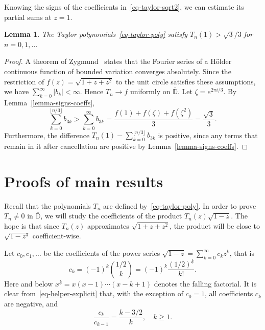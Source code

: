 \documentclass[12pt]{amsart}
\newtheorem{lemma}[theorem]{Lemma}
\theoremstyle{definition}
\theoremstyle{remark}
\numberwithin{equation}{section}
\begin{document}
Knowing the signs of the coefficients in~\eqref{eq-taylor-sqrt2}, we can estimate its partial sums at $z=1$. 

\begin{lemma}\label{lemma-taylor-at1} The Taylor polynomials~\eqref{eq-taylor-poly} satisfy $T_n(1)>\sqrt{3}/3$ for $n=0,1,\dots$
\end{lemma}

\begin{proof} A theorem of Zygmund~\cite[Theorem VI.3.6]{Zygmund} states that the Fourier series of a H\"older continuous function of bounded variation converges absolutely. Since the restriction of $f(z)=\sqrt{1+z+z^2}$ to the unit circle satisfies these assumptions, we have $\sum_{k=0}^\infty |b_k| < \infty$. Hence $T_n\to f$ uniformly on $\overline{\mathbb D}$. Let $\zeta = e^{2\pi i/3}$. By Lemma~\ref{lemma-signs-coeffs}, 
\[
\sum_{k=0}^{\lfloor n/3\rfloor} b_{3k} > 
\sum_{k=0}^\infty b_{3k} = \frac{f(1) + f(\zeta) + f(\zeta^2)}{3} = \frac{\sqrt{3}}{3}. 
\]
Furthermore, the difference 
$T_n(1) - \sum_{k=0}^{\lfloor n/3\rfloor} b_{3k}$ is positive, since any terms that remain in it after cancellation are positive by Lemma~\ref{lemma-signs-coeffs}. 
\end{proof}



\section{Proofs of main results} \label{sec-main-proofs}

Recall that the polynomials $T_n$ are defined by~\eqref{eq-taylor-poly}. In order to prove $T_n\ne 0$ in $\overline{\mathbb D}$, we will study the coefficients of the product $T_n(z)\sqrt{1-z}$. The hope is that since $T_n(z)$ approximates $\sqrt{1+z+z^2}$, the product will be close to $\sqrt{1-z^3}$ coefficient-wise. 

Let $c_0, c_1, \dots$ be the coefficients of the power series $\sqrt{1-z} = \sum_{k=0}^\infty c_k z^k$, that is 
\begin{equation}\label{eq-helper-explicit}
c_k = (-1)^k \binom{1/2}{k} = (-1)^k \frac{(1/2)^{\underline{k}}}{k!}.
\end{equation}
Here and below $x^{\underline{k}} = x(x-1)\cdots (x-k+1)$ denotes the falling factorial. 
It is clear from~\eqref{eq-helper-explicit} that, with the exception of $c_0=1$, all coefficients $c_k$ are negative, and 
\begin{equation}\label{eq-helper-recurrence}
\frac{c_{k}}{c_{k-1}} = \frac{k-3/2}{k},\quad k\ge 1.    
\end{equation} 
\end{document}
